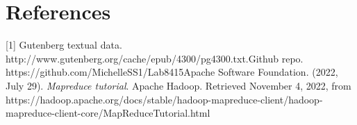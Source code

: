\documentclass[11pt]{article}
\begin{document}
\section{References}
[1] Gutenberg textual data. http://www.gutenberg.org/cache/epub/4300/pg4300.txt.\newline
[2] Github repo. https://github.com/MichelleSS1/Lab8415\newline
[3] Apache Software Foundation. (2022, July 29). {\it{Mapreduce tutorial}}. Apache Hadoop. Retrieved November 4, 2022, from https://hadoop.apache.org/docs/stable/hadoop-mapreduce-client/hadoop-mapreduce-client-core/MapReduceTutorial.html 
\end{document}
